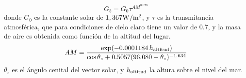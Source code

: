 \begin{equation}
  \label{eq:DNI}
  G_b = G_0 \tau^{AM^{0.678}}
\end{equation}
donde $G_0$ es la constante solar de $1,367 \rm W/m^2$, y $\tau$ es la transmitancia atmosférica, que para condiciones de cielo claro tiene un valor de 0.7, y la masa de aire es obtenida como función de la altitud del lugar.
\begin{equation}
  \label{eq:AM}
  AM = \frac{ \exp(-0.0001184\,h_{\rm altitud})}{\cos \theta_z + 0.5057(96.080-\theta_z)^{-1.634}}
\end{equation}
$\theta_z$ es el ángulo cenital del vector solar, y $h_{\rm altitud}$ la altura sobre el nivel del mar.


